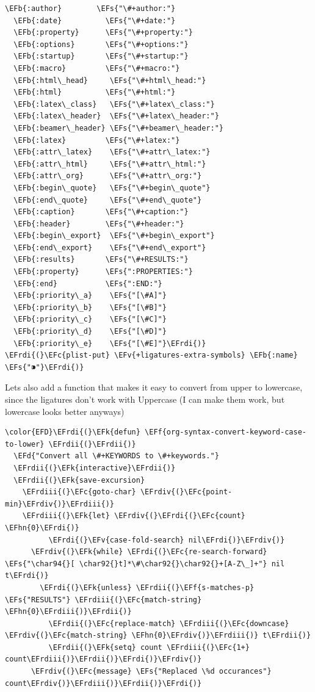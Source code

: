 \documentclass{scrartcl}
\newcommand{\EFk}[1]{\textcolor{EFk}{#1}} %
\newcommand{\EFd}[1]{\textcolor{EFd}{#1}} %
\newcommand{\EFs}[1]{\textcolor{EFs}{#1}} %
\newcommand{\EFb}[1]{\textcolor{EFb}{#1}} %
\newcommand{\EFc}[1]{\textcolor{EFc}{#1}} %
\newcommand{\EFv}[1]{\textcolor{EFv}{#1}} %
\newcommand{\EFf}[1]{\textcolor{EFf}{#1}} %
\newcommand{\EFhn}[1]{#1} %
\newcommand{\EFrdi}[1]{#1} %
\newcommand{\EFrdii}[1]{#1} %
\newcommand{\EFrdiii}[1]{#1} %
\newcommand{\EFrdiv}[1]{#1} %
\begin{document}
\begin{Code}
\begin{Verbatim}[]
  \EFb{:author}        \EFs{"\#+author:"}
  \EFb{:date}          \EFs{"\#+date:"}
  \EFb{:property}      \EFs{"\#+property:"}
  \EFb{:options}       \EFs{"\#+options:"}
  \EFb{:startup}       \EFs{"\#+startup:"}
  \EFb{:macro}         \EFs{"\#+macro:"}
  \EFb{:html\_head}     \EFs{"\#+html\_head:"}
  \EFb{:html}          \EFs{"\#+html:"}
  \EFb{:latex\_class}   \EFs{"\#+latex\_class:"}
  \EFb{:latex\_header}  \EFs{"\#+latex\_header:"}
  \EFb{:beamer\_header} \EFs{"\#+beamer\_header:"}
  \EFb{:latex}         \EFs{"\#+latex:"}
  \EFb{:attr\_latex}    \EFs{"\#+attr\_latex:"}
  \EFb{:attr\_html}     \EFs{"\#+attr\_html:"}
  \EFb{:attr\_org}      \EFs{"\#+attr\_org:"}
  \EFb{:begin\_quote}   \EFs{"\#+begin\_quote"}
  \EFb{:end\_quote}     \EFs{"\#+end\_quote"}
  \EFb{:caption}       \EFs{"\#+caption:"}
  \EFb{:header}        \EFs{"\#+header:"}
  \EFb{:begin\_export}  \EFs{"\#+begin\_export"}
  \EFb{:end\_export}    \EFs{"\#+end\_export"}
  \EFb{:results}       \EFs{"\#+RESULTS:"}
  \EFb{:property}      \EFs{":PROPERTIES:"}
  \EFb{:end}           \EFs{":END:"}
  \EFb{:priority\_a}    \EFs{"[\#A]"}
  \EFb{:priority\_b}    \EFs{"[\#B]"}
  \EFb{:priority\_c}    \EFs{"[\#C]"}
  \EFb{:priority\_d}    \EFs{"[\#D]"}
  \EFb{:priority\_e}    \EFs{"[\#E]"}\EFrdi{)}
\EFrdi{(}\EFc{plist-put} \EFv{+ligatures-extra-symbols} \EFb{:name} \EFs{"⁍"}\EFrdi{)}
\end{Verbatim}
\end{Code}

Lets also add a function that makes it easy to convert from upper to lowercase,
since the ligatures don't work with Uppercase (I can make them work, but
lowercase looks better anyways)
\begin{Code}
\begin{Verbatim}[]
\color{EFD}\EFrdi{(}\EFk{defun} \EFf{org-syntax-convert-keyword-case-to-lower} \EFrdii{(}\EFrdii{)}
  \EFd{"Convert all \#+KEYWORDS to \#+keywords."}
  \EFrdii{(}\EFk{interactive}\EFrdii{)}
  \EFrdii{(}\EFk{save-excursion}
    \EFrdiii{(}\EFc{goto-char} \EFrdiv{(}\EFc{point-min}\EFrdiv{)}\EFrdiii{)}
    \EFrdiii{(}\EFk{let} \EFrdiv{(}\EFrdi{(}\EFc{count} \EFhn{0}\EFrdi{)}
          \EFrdi{(}\EFv{case-fold-search} nil\EFrdi{)}\EFrdiv{)}
      \EFrdiv{(}\EFk{while} \EFrdi{(}\EFc{re-search-forward} \EFs{"\char94{}[ \char92{}t]*\#\char92{}\char92{}+[A-Z\_]+"} nil t\EFrdi{)}
        \EFrdi{(}\EFk{unless} \EFrdii{(}\EFf{s-matches-p} \EFs{"RESULTS"} \EFrdiii{(}\EFc{match-string} \EFhn{0}\EFrdiii{)}\EFrdii{)}
          \EFrdii{(}\EFc{replace-match} \EFrdiii{(}\EFc{downcase} \EFrdiv{(}\EFc{match-string} \EFhn{0}\EFrdiv{)}\EFrdiii{)} t\EFrdii{)}
          \EFrdii{(}\EFk{setq} count \EFrdiii{(}\EFc{1+} count\EFrdiii{)}\EFrdii{)}\EFrdi{)}\EFrdiv{)}
      \EFrdiv{(}\EFc{message} \EFs{"Replaced \%d occurances"} count\EFrdiv{)}\EFrdiii{)}\EFrdii{)}\EFrdi{)}
\end{Verbatim}
\end{Code}
\end{document}
